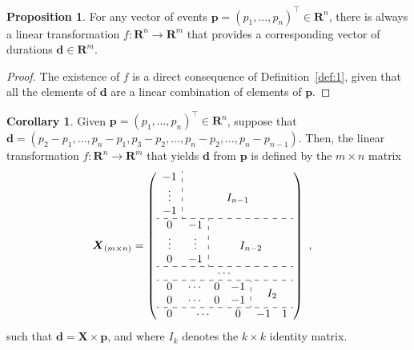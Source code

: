 \documentclass{bmcart}
\theoremstyle{definition}
\newtheorem{proposition}{Proposition}[section]
\newtheorem{corollary}{Corollary}[proposition]
\begin{document}
\begin{proposition}
 For any vector of events $\boldsymbol{p}=(p_1,\ldots,p_n)^\top\in\mathbf{R}^n$, there is always a linear transformation $f:\mathbf{R}^n\to\mathbf{R}^m$ that provides a corresponding vector of durations $\boldsymbol{d}\in\mathbf{R}^m$.
 \label{prop:2}
\end{proposition}

\begin{proof}
 The existence of $f$ is a direct consequence of Definition~\ref{def:1}, given that all the elements of $\boldsymbol{d}$ are a linear combination of elements of $\boldsymbol{p}$. 
\end{proof}

\begin{corollary}
 Given $\boldsymbol{p}=(p_1,\ldots,p_n)^\top\in\mathbf{R}^n$, suppose that $\boldsymbol{d}=(p_2-p_1,\dots,p_n-p_1,p_3-p_2,\dots,p_n-p_2,\dots,p_n-p_{n-1})$. Then, the linear transformation $f:\mathbf{R}^n\to\mathbf{R}^m$ that yields $\boldsymbol{d}$ from $\boldsymbol{p}$ is defined by the $m\times n$ matrix
 \begin{align}
  \boldsymbol{X}_{(m\times n)}&= \left(\begin{array}{cccccc}
			  \multicolumn{1}{c:}{-1}			& \multicolumn{5}{c}{}					\\
			  \multicolumn{1}{c:}{\vdots}	 		& \multicolumn{5}{c}{I_{n-1}}	 			\\  
			  \multicolumn{1}{c:}{-1}			& \multicolumn{5}{c}{}					\\ \hdashline
			  0		& \multicolumn{1}{c:}{-1}	& \multicolumn{4}{c}{}					\\	 
			  \vdots	& \multicolumn{1}{c:}{\vdots}	& \multicolumn{4}{c}{I_{n-2}}  				\\
			  0		& \multicolumn{1}{c:}{-1}	& \multicolumn{4}{c}{}					\\ \hdashline
			  \multicolumn{6}{c}{\cdots}										\\ \hdashline
			  0		& \cdots	& 0		& \multicolumn{1}{c:}{-1}	& 	& 		\\ 
			  0		& \cdots	& 0		& \multicolumn{1}{c:}{-1}	& \multicolumn{2}{c}{\smash{\raisebox{.5\normalbaselineskip}{$I_2$}}}	\\ \hdashline
			  0		& \multicolumn{2}{c}{\cdots}	& 0				& -1	& 1		\\
			\end{array}\right)
  \label{eq:matrix}\ ,
 \end{align}
 such that $\boldsymbol{d}=\boldsymbol{X}\times\boldsymbol{p}$, and where $I_k$ denotes the $k\times k$ identity matrix.
\end{corollary}
\end{document}
